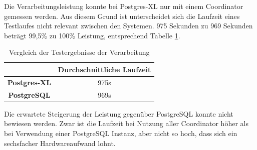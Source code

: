 Die Verarbeitungsleistung konnte bei Postgres-XL nur mit einem Coordinator gemessen werden.
Aus diesem Grund ist unterscheidet sich die Laufzeit eines Testlaufes nicht relevant zwischen den Systemen.
975 Sekunden zu 969 Sekunden beträgt 99,5\%{} zu 100\%{} Leistung, entsprechend Tabelle \ref{tbl:verglergebnisse2}.
\begin{table}[h!]
\centering
\begin{tabular}{c|c}
 & \textbf{Durchschnittliche Laufzeit} \\ \hline
\textbf{Postgres-XL} & 975s \\ \hline
\textbf{PostgreSQL} & 969s \\	
\end{tabular}
\caption[Vergleich der Testergebnisse der Verarbeitung]{Vergleich der Testergebnisse der Verarbeitung}
\label{tbl:verglergebnisse2}
\end{table}

Die erwartete Steigerung der Leistung gegenüber PostgreSQL konnte nicht bewiesen werden.
Zwar ist die Laufzeit bei Nutzung aller Coordinator höher als bei Verwendung einer PostgreSQL Instanz, aber nicht so hoch, dass sich ein sechsfacher Hardwareaufwand lohnt.